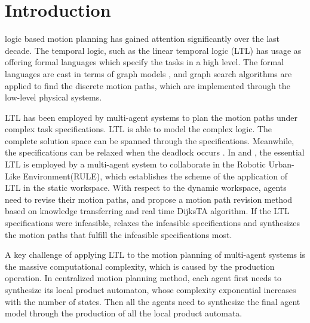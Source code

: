 \documentclass[journal]{IEEEtran}
\begin{document}
\section{Introduction}
%
%
%
%
 logic based motion planning has gained attention significantly over the last decade. The temporal logic, such as the linear temporal logic (LTL) has usage as offering formal languages which specify the tasks in a high level. The formal languages are cast in terms of graph models \cite{GASTIN2001Fast}, and graph search algorithms are applied to find the discrete motion paths, which are implemented through the low-level physical systems.\par
LTL has been employed by multi-agent systems to plan the motion paths under complex task specifications. LTL is able to model the complex logic. The complete solution space can be spanned through the specifications. Meanwhile, the specifications can be relaxed when the deadlock occurs \cite{guo2013reconfiguration}. In \cite{Chen2013A} and \cite{chen2012formal}, the essential LTL is employed by a multi-agent system to collaborate in the Robotic Urban-Like Environment(RULE), which establishes the scheme of the application of LTL in the static workspace. With respect to the dynamic workspace, agents need to revise their motion paths, \cite{guo2013revising} and \cite{guo2015multi} propose a motion path revision method based on knowledge transferring and real time DijksTA algorithm. If the LTL specifications were infeasible, \cite{guo2013reconfiguration} relaxes the infeasible specifications and synthesizes the motion paths that fulfill the infeasible specifications most. \par
A key challenge of applying LTL to the motion planning of multi-agent systems is the massive computational complexity, which is caused by the production operation. In centralized motion planning method, each agent first needs to synthesize its local product automaton, whose complexity exponential increases with the number of states. Then all the agents need to synthesize the final agent model through the production of all the local product automata.
\end{document}
